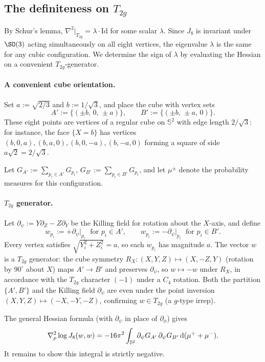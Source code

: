 \documentclass[a4paper]{amsart}
\newcommand{\uS}{\mathbb{S}}
\newcommand{\Hess}{\nabla^2}
\newcommand{\dd}{{\rm d}}
\theoremstyle{plain} %
\theoremstyle{definition} %
\theoremstyle{remark}
\begin{document}
\subsection{The definiteness on \texorpdfstring{$T_{2g}$}{T2g}}

By Schur's lemma, $\Hess|_{T_{2g}}=\lambda\cdot\mathrm{Id}$ for some scalar
$\lambda$.  Since $J_8$ is invariant under $\SO(3)$ acting simultaneously on all
eight vertices, the eigenvalue $\lambda$ is the same for any cubic configuration.
We determine the sign of $\lambda$ by evaluating the Hessian on a convenient
$T_{2g}$-generator.

\paragraph{A convenient cube orientation.}
Set $a:=\sqrt{2/3}$ and $b:=1/\sqrt{3}$, and place the cube with vertex sets
\[
	A':=\bigl\{(\pm b,\,0,\,\pm a)\bigr\},
	\qquad
	B':=\bigl\{(\pm b,\,\pm a,\,0)\bigr\}.
\]
These eight points are vertices of a regular cube on $\uS^2$ with edge length
$2/\sqrt{3}$: for instance, the face $\{X=b\}$ has vertices
$(b,0,a),(b,a,0),(b,0,-a),(b,-a,0)$ forming a square of side $a\sqrt{2}=2/\sqrt{3}$.

Let $G_{A'}:=\sum_{p_i\in A'}G_{p_i}$, $G_{B'}:=\sum_{p_i\in B'}G_{p_i}$, and
let $\mu^\pm$ denote the probability measures for this configuration.

\paragraph{\texorpdfstring{$T_{2g}$}{T2g} generator.}
Let $\partial_\psi:=Y\partial_Z-Z\partial_Y$ be the Killing field for rotation
about the $X$-axis, and define
\[
	w_{p_i}:=+\partial_\psi\big|_{p_i}\;\text{ for }p_i\in A',
	\qquad
	w_{p_i}:=-\partial_\psi\big|_{p_i}\;\text{ for }p_i\in B'.
\]
Every vertex satisfies $\sqrt{Y_i^2+Z_i^2}=a$, so each $w_{p_i}$ has magnitude $a$.
The vector $w$ is a $T_{2g}$ generator: the cube symmetry
$R_X\colon(X,Y,Z)\mapsto(X,-Z,Y)$ (rotation by $90^\circ$ about $X$) maps
$A'\to B'$ and preserves $\partial_\psi$, so $w\mapsto -w$ under $R_X$,
in accordance with the $T_{2g}$ character $(-1)$ under a $C_4$ rotation.
Both the partition $\{A',B'\}$ and the Killing field $\partial_\psi$ are even
under the point inversion $(X,Y,Z)\mapsto(-X,-Y,-Z)$, confirming $w\in T_{2g}$
(a $g$-type irrep).

The general Hessian formula (with $\partial_\psi$ in place of $\partial_\phi$) gives
\[
	\Hess_p\log J_8(w,w)
	= -16\pi^2\int_{\uS^2}\partial_\psi G_{A'}\,\partial_\psi G_{B'}\,\dd(\mu^++\mu^-).
\]
It remains to show this integral is strictly negative.
\end{document}

